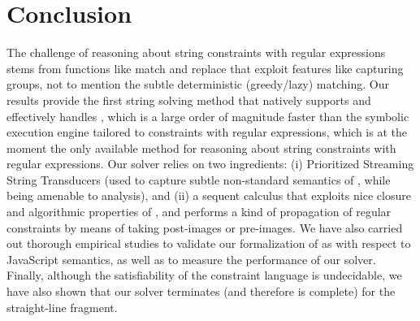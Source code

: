 
\section{Conclusion}\label{sec-conc}
The challenge of reasoning about string constraints with regular expressions
stems from functions like match and replace that exploit features like capturing groups, not to mention the subtle deterministic
(greedy/lazy) matching. Our results provide the first string 
solving method that natively supports and effectively handles \regexp{}, which 
is a large order of magnitude faster than the symbolic execution engine 
\expose{} \cite{LMK19} tailored to constraints with regular expressions, 
which is at the moment the only available method for reasoning about string 
constraints with regular expressions. Our solver \ostrich{} relies on two ingredients: 
(i) Prioritized Streaming String Transducers (used to capture subtle non-standard
semantics of \regexp{}, while being amenable to analysis), and
(ii) a sequent calculus that exploits nice closure and algorithmic properties of
\PSST, and performs a kind of propagation of regular constraints by means of 
taking post-images or pre-images. We have also carried out thorough empirical studies
to validate our formalization of \regexp{} as {\PSST} with respect to JavaScript
semantics, as well as to measure the performance of our solver.
Finally, although the satisfiability of the constraint language is %
undecidable, we have also shown that our solver terminates (and therefore is
complete) for the %
straight-line fragment.





 

